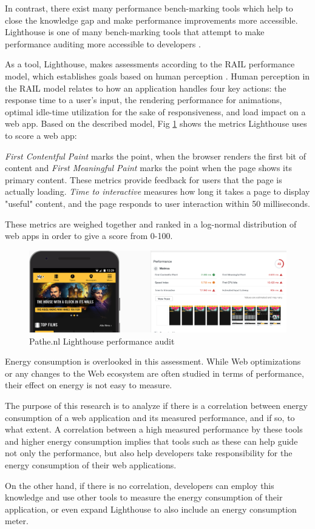 In contrast, there exist many performance bench-marking tools which help to close the knowledge gap and make performance improvements more accessible. Lighthouse is one of many bench-marking tools that attempt to make performance auditing more accessible to developers \cite{Web:Lighthouse}.

As a tool, Lighthouse, makes assessments according to the RAIL performance model, which establishes goals based on human perception \cite{Web:Rail}. Human perception in the RAIL model relates to how an application handles four key actions: the response time to a user's input, the rendering performance for animations, optimal idle-time utilization for the sake of responsiveness, and load impact on a web app. Based on the described model, Fig \ref{fig:Lighthouse} shows the metrics Lighthouse uses to score a web app:

\textit{First Contentful Paint} marks the point, when the browser renders the first bit of content and \textit{First Meaningful Paint} marks the point when the page shows its primary content. These metrics provide feedback for users that the page is actually loading. \textit{Time to interactive} measures how long it takes a page to display "useful" content, and the page responds to user interaction within 50 milliseconds.

These metrics are weighed together and ranked in a log-normal distribution of web apps in order to give a score from 0-100.

\begin{figure}[H]
  \includegraphics[width=\linewidth]{./Images/lighthousescore.png}
  \caption{Pathe.nl Lighthouse performance audit}
  \label{fig:Lighthouse}
\end{figure}

Energy consumption is overlooked in this assessment. While Web optimizations or any changes to the Web ecosystem are often studied in terms of performance, their effect on energy is not easy to measure. 

The purpose of this research is to analyze if there is a correlation between energy consumption of a web application and its measured performance, and if so, to what extent. A correlation between a high measured performance by these tools and higher energy consumption implies that tools such as these can help guide not only the performance, but also help developers take responsibility for the energy consumption of their web applications.

On the other hand, if there is no correlation, developers can employ this knowledge and use other tools to measure the energy consumption of their application, or even expand Lighthouse to also include an energy consumption meter.
\newline


